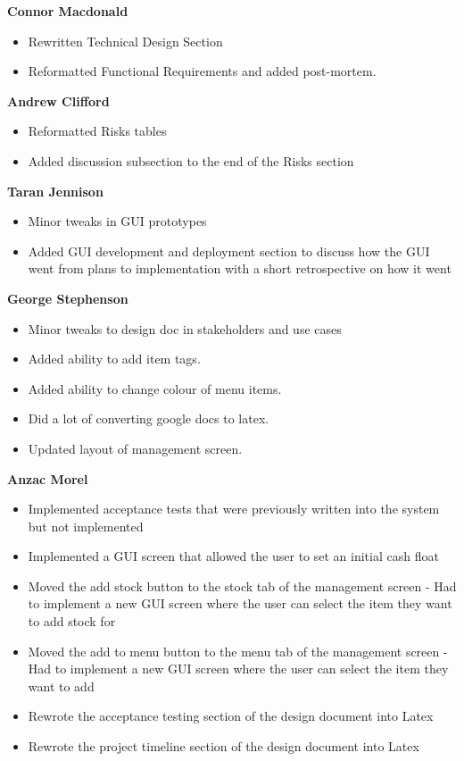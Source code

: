 \textbf{Connor Macdonald}
\begin{itemize}
	\item Rewritten Technical Design Section
	\item Reformatted Functional Requirements and added post-mortem.
\end{itemize}

\textbf{Andrew Clifford}
\begin{itemize}
	\item Reformatted Risks tables
	\item Added discussion subsection to the end of the Risks section
\end{itemize}

\textbf{Taran Jennison}
\begin{itemize}
	\item Minor tweaks in GUI prototypes
	\item Added GUI development and deployment section to discuss how the GUI went from plans to implementation with a short retrospective on how it went
\end{itemize}

\textbf{George Stephenson}
\begin{itemize}
	\item Minor tweaks to design doc in stakeholders and use cases
	\item Added ability to add item tags.
	\item Added ability to change colour of menu items.
	\item Did a lot of converting google docs to latex.
	\item Updated layout of management screen.
\end{itemize}

\noindent\textbf{Anzac Morel}
\begin{itemize}
	\item Implemented acceptance tests that were previously written into the system but not implemented
	\item Implemented a GUI screen that allowed the user to set an initial cash float
	\item Moved the add stock button to the stock tab of the management screen - Had to implement a new GUI screen where the user can select the item they want to add stock for
	\item Moved the add to menu button to the menu tab of the management screen - Had to implement a new GUI screen where the user can select the item they want to add
	\item Rewrote the acceptance testing section of the design document into Latex
	\item Rewrote the project timeline section of the design document into Latex
\end{itemize}


